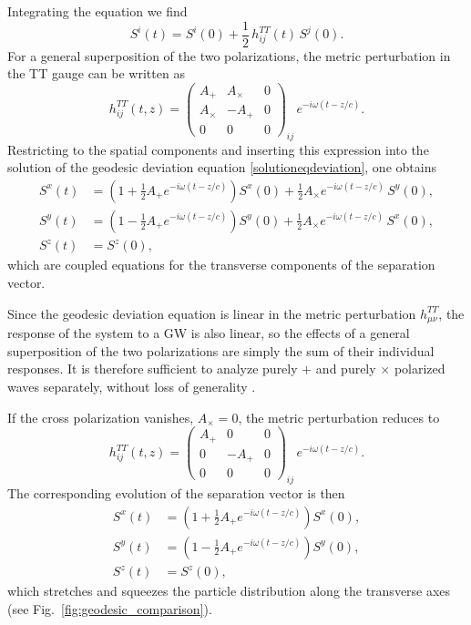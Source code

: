 Integrating the equation we find
\begin{equation}
S^i(t) = S^i(0) + \frac{1}{2}\, h^{TT}_{ij}(t)\, S^j(0).
\label{solutioneqdeviation}
\end{equation}
For a general superposition of the two polarizations, the metric perturbation in
the TT gauge can be written as
\begin{equation}
h^{TT}_{ij}(t,z) =
\begin{pmatrix}
A_{+} & A_{\times} & 0 \\
A_{\times} & -A_{+} & 0 \\
0 & 0 & 0
\end{pmatrix}_{ij}
\, e^{-i \omega (t - z / c)} .
\end{equation}
Restricting to the spatial components and inserting this expression into the
solution of the geodesic deviation equation \eqref{solutioneqdeviation}, one obtains
\begin{equation}
\begin{aligned}
S^x(t) &=
\left(1 + \frac{1}{2} A_{+} e^{-i \omega (t - z / c)} \right) S^x(0)
+ \frac{1}{2} A_{\times} e^{-i \omega (t - z / c)} \, S^y(0), \\[6pt]
S^y(t) &=
\left(1 - \frac{1}{2} A_{+} e^{-i \omega (t - z / c)} \right) S^y(0)
+ \frac{1}{2} A_{\times} e^{-i \omega (t - z / c)} \, S^x(0), \\[6pt]
S^z(t) &= S^z(0),
\end{aligned}
\end{equation}
which are coupled equations for the transverse components of the separation vector.

Since the geodesic deviation equation is linear in the metric perturbation
$h^{TT}_{\mu\nu}$, the response of the system to a GW is also
linear, so the effects of a general superposition of the two
polarizations are simply the sum of their individual responses. It is
therefore sufficient to analyze purely $+$ and purely $\times$ polarized
waves separately, without loss of generality \cite{llibretongGR}.


If the cross polarization vanishes, $A_{\times}=0$, the metric perturbation
reduces to
\begin{equation}
h^{TT}_{ij}(t,z) =
\begin{pmatrix}
A_{+} & 0 & 0 \\
0 & -A_{+} & 0 \\
0 & 0 & 0
\end{pmatrix}_{ij}
\, e^{-i \omega (t - z / c)} .
\end{equation}
The corresponding evolution of the separation vector is then
\begin{equation}
\begin{aligned}
S^x(t) &=
\left(1 + \frac{1}{2} A_{+} e^{-i \omega (t - z / c)} \right) S^x(0), \\[6pt]
S^y(t) &=
\left(1 - \frac{1}{2} A_{+} e^{-i \omega (t - z / c)} \right) S^y(0), \\[6pt]
S^z(t) &= S^z(0),
\end{aligned}
\end{equation}
which stretches and squeezes the particle distribution along the transverse axes (see Fig.~\ref{fig:geodesic_comparison}).



